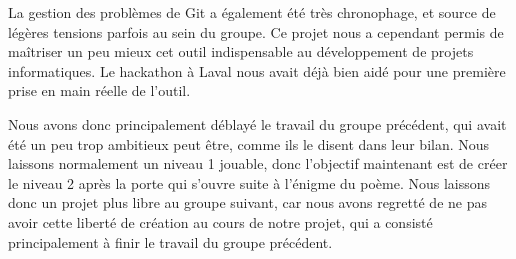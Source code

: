 \documentclass[12pt]{article}
\begin{document}
La gestion des problèmes de Git a également été très chronophage, et source de légères tensions parfois au sein du groupe. Ce projet nous a cependant permis de maîtriser un peu mieux cet outil indispensable au développement de projets informatiques. Le hackathon à Laval nous avait déjà bien aidé pour une première prise en main réelle de l’outil.

Nous avons donc principalement déblayé le travail du groupe précédent, qui avait été un peu trop ambitieux peut être, comme ils le disent dans leur bilan. Nous laissons normalement un niveau 1 jouable, donc l’objectif maintenant est de créer le niveau 2 après la porte qui s’ouvre suite à l’énigme du poème. Nous laissons donc un projet plus libre au groupe suivant, car nous avons regretté de ne pas avoir cette liberté de création au cours de notre projet, qui a consisté principalement à finir le travail du groupe précédent.
\end{document}
